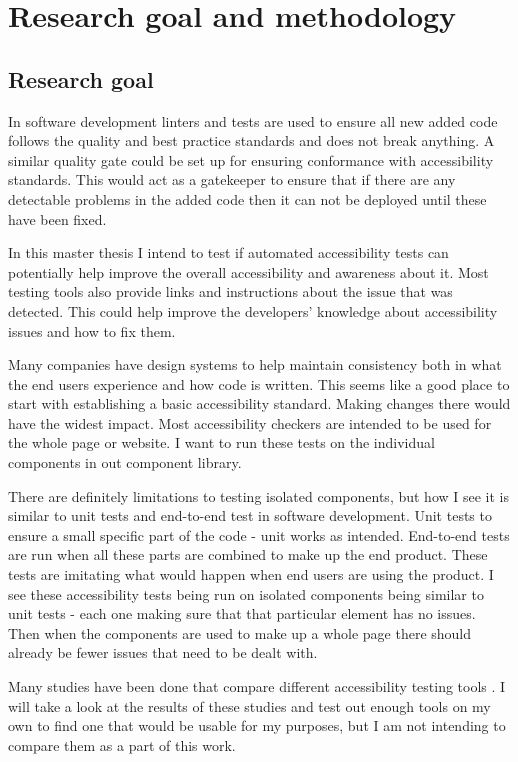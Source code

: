 \documentclass{master_thesis}
\begin{document}
\section{Research goal and methodology}
\subsection{Research goal}

In software development linters and tests are used to ensure all new added code follows the quality and best practice standards and does not break anything. A similar quality gate could be set up for ensuring conformance with accessibility standards. This would act as a gatekeeper to ensure that if there are any detectable problems in the added code then it can not be deployed until these have been fixed.

In this master thesis I intend to test if automated accessibility tests can potentially help improve the overall accessibility and awareness about it. Most testing tools also provide links and instructions about the issue that was detected. This could help improve the developers' knowledge about accessibility issues and how to fix them.

Many companies have design systems to help maintain consistency both in what the end users experience and how code is written. This seems like a good place to start with establishing a basic accessibility standard. Making changes there would have the widest impact. Most accessibility checkers are intended to be used for the whole page or website. I want to run these tests on the individual components in out component library.

There are definitely limitations to testing isolated components, but how I see it is similar to unit tests and end-to-end test in software development. Unit tests to ensure a small specific part of the code - unit works as intended. End-to-end tests are run when all these parts are combined to make up the end product. These tests are imitating what would happen when end users are using the product. I see these accessibility tests being run on isolated components being similar to unit tests - each one making sure that that particular element has no issues. Then when the components are used to make up a whole page there should already be fewer issues that need to be dealt with.

Many studies have been done that compare different accessibility testing tools \citep{Alsaeedi2020,Ismailova2022,Sane2021,Vigo2013,RybinKoob2022,Duran2017}. I will take a look at the results of these studies and test out enough tools on my own to find one that would be usable for my purposes, but I am not intending to compare them as a part of this work.
\end{document}
